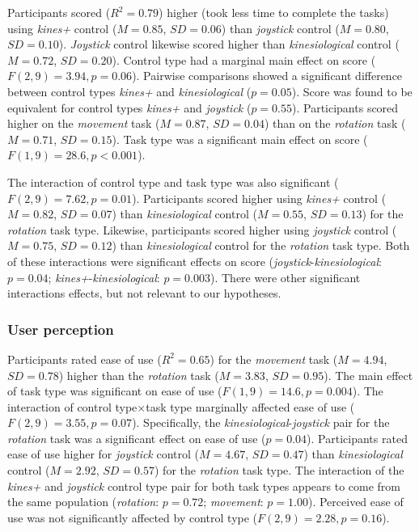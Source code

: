 \documentclass{sigchi}
\begin{document}
Participants scored ($R^{2}=0.79$) higher (took less time to complete the tasks) using \textit{kines+} control ($M=0.85$, $SD=0.06$) than \textit{joystick} control ($M=0.80$, $SD=0.10$). \textit{Joystick} control likewise scored higher than \textit{kinesiological} control ($M=0.72$, $SD=0.20$). Control type had a marginal main effect on score ($F(2, 9)=3.94, p=0.06$). Pairwise comparisons showed a significant difference between control types \textit{kines+} and \textit{kinesiological} ($p=0.05$). Score was found to be equivalent for control types \textit{kines+} and \textit{joystick} ($p=0.55$). Participants scored higher on the \textit{movement} task ($M=0.87$, $SD=0.04$) than on the \textit{rotation} task ($M=0.71$, $SD=0.15$). Task type was a significant main effect on score ($F(1, 9)=28.6, p<0.001$).

The interaction of control type and task type was also significant ($F(2, 9)=7.62, p=0.01$). Participants scored higher using \textit{kines+} control ($M=0.82$, $SD=0.07$) than \textit{kinesiological} control ($M=0.55$, $SD=0.13$) for the \textit{rotation} task type. Likewise,  participants scored higher using \textit{joystick} control ($M=0.75$, $SD=0.12$) than \textit{kinesiological} control for the \textit{rotation} task type. Both of these interactions were significant effects on score (\textit{joystick}-\textit{kinesiological}: $p=0.04$; \textit{kines+}-\textit{kinesiological}: $p=0.003$). 
There were other significant interactions effects, but not relevant to our hypotheses.

\subsubsection{User perception}

Participants rated ease of use ($R^{2}=0.65$) for the \textit{movement} task ($M=4.94$, $SD=0.78$) higher than the \textit{rotation} task ($M=3.83$, $SD=0.95$). The main effect of task type was significant on ease of use ($F(1, 9)=14.6, p=0.004$). The interaction of control type$\times$task type marginally affected ease of use ($F(2, 9)=3.55, p=0.07$). Specifically, the \textit{kinesiological}-\textit{joystick} pair for the \textit{rotation} task was a significant effect on ease of use ($p=0.04$). Participants rated ease of use higher for \textit{joystick} control ($M=4.67$, $SD=0.47$) than \textit{kinesiological} control ($M=2.92$, $SD=0.57$) for the \textit{rotation} task type. 
The interaction of the \textit{kines+} and \textit{joystick} control type pair for both task types appears to come from the same population (\textit{rotation}: $p=0.72$; \textit{movement}: $p=1.00$). Perceived ease of use was not significantly affected by control type ($F(2, 9)=2.28, p=0.16$).
\end{document}
